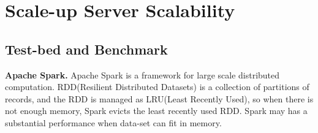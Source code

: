 
\section{Scale-up Server Scalability}
\label{sec:scale}




\ifkor
\else

\fi



\subsection{Test-bed and Benchmark}

\ifkor
\noindent
\textbf{Apache Spark. }
Apache Spark is a framework for large scale distributed computation.
RDD(Resilient Distributed Datasets) is a collection of partitions of records, 
and the RDD is managed as LRU(Least Recently Used), so when there is not enough
memory, Spark evicts the least recently used RDD.
Spark may has a substantial performance when data-set can fit in memory.


\else
\fi

